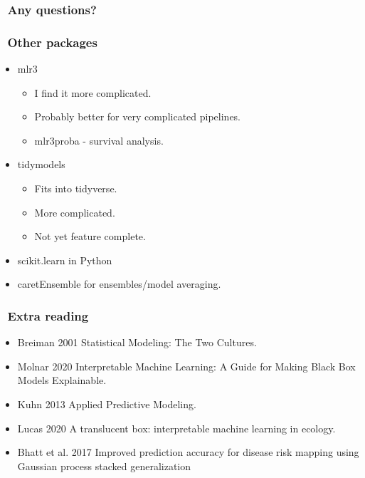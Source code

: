 \documentclass[handout, aspectratio = 169]{beamer}
\begin{document}
\begin{frame}
\frametitle{\insertframenumber~Any questions?}


\end{frame} 





\begin{frame}
\frametitle{\insertframenumber~Other packages}

\begin{itemize}
\item mlr3
	\begin{itemize}
	\item I find it more complicated. 
	\item Probably better for very complicated pipelines.
	\item mlr3proba - survival analysis.
	\end{itemize}
\item tidymodels
	\begin{itemize}
	\item Fits into tidyverse.
	\item More complicated.
	\item Not yet feature complete.
	\end{itemize}
\item scikit.learn in Python
\item caretEnsemble for ensembles/model averaging.
\end{itemize}
\end{frame} 




\begin{frame}
\frametitle{\insertframenumber~Extra reading}

\begin{itemize}
\item Breiman 2001 Statistical Modeling: The Two Cultures.
\item Molnar 2020 Interpretable Machine Learning: A Guide for Making Black Box Models Explainable.
\item Kuhn 2013 Applied Predictive Modeling.
\item Lucas 2020 A translucent box: interpretable machine learning in ecology.
\item Bhatt et al. 2017 Improved prediction accuracy for disease risk mapping using Gaussian process stacked generalization
\end{itemize}
\end{frame} 
\end{document}
